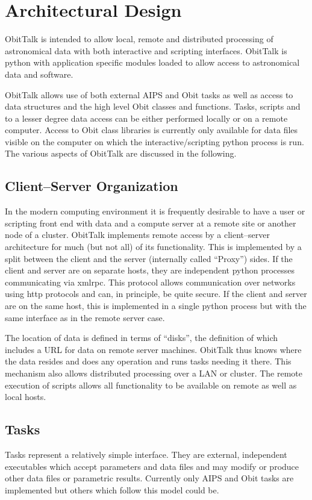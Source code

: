 \documentclass[11pt]{report}
\begin{document}
\section {Architectural Design}
ObitTalk is intended to allow local, remote and distributed processing
of astronomical data with both interactive and scripting interfaces.
ObitTalk is python with application specific modules loaded to allow
access to astronomical data and software.

ObitTalk allows use of both external AIPS and Obit tasks as well as
access to data structures and the high level Obit classes and functions.
Tasks, scripts and to a lesser degree data access can be either performed
locally or on a remote computer.
Access to Obit class libraries is currently only available for data
files visible on the computer on which the interactive/scripting
python process is run.
The various aspects of ObitTalk are discussed in the following.

\subsection {Client--Server Organization}
In the modern computing environment it is frequently desirable to have
a user or scripting front end with data and a compute server at a
remote site or another node of a cluster.
ObitTalk implements remote access by a client--server architecture for
much (but not all) of its functionality.
This is implemented by a split between the client and the server
(internally called ``Proxy'') sides.
If the client and server are on separate hosts, they are
independent python processes communicating via xmlrpc.
This protocol allows communication over networks using http protocols
and can, in principle, be quite secure.
If the client and server are on the same host, this is implemented in
a single python process but with the same interface as in the remote
server case.

The location of data is defined in terms of ``disks'', the definition
of which includes a URL for data on remote server machines.
ObitTalk thus knows where the data resides and does any operation and
runs tasks needing it there. 
This mechanism also allows distributed processing over a LAN or cluster.
The remote execution of scripts allows all functionality to be
available on remote as well as local hosts. 

\subsection{Tasks}
Tasks represent a relatively simple interface.
They are external, independent executables which accept parameters and
data files and may modify or produce other data files or
parametric results.
Currently only AIPS and Obit tasks are implemented but others which
follow this model could be.
\end{document}
